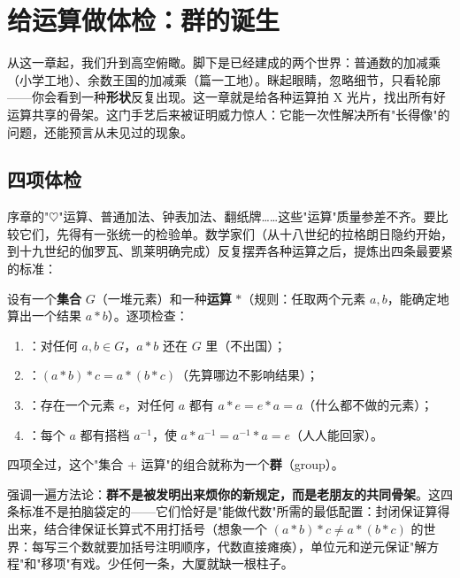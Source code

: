 \chapter{给运算做体检：群的诞生}

从这一章起，我们升到高空俯瞰。脚下是已经建成的两个世界：普通数的加减乘（小学工地）、余数王国的加减乘（篇一工地）。眯起眼睛，忽略细节，只看轮廓——你会看到一种\textbf{形状}反复出现。这一章就是给各种运算拍 X 光片，找出所有好运算共享的骨架。这门手艺后来被证明威力惊人：它能一次性解决所有"长得像"的问题，还能预言从未见过的现象。

\section{四项体检}

序章的"$\heartsuit$"运算、普通加法、钟表加法、翻纸牌……这些"运算"质量参差不齐。要比较它们，先得有一张统一的检验单。数学家们（从十八世纪的拉格朗日隐约开始，到十九世纪的伽罗瓦、凯莱明确完成）反复摆弄各种运算之后，提炼出四条最要紧的标准：

\begin{dingyi}
设有一个\textbf{集合} $G$（一堆元素）和一种\textbf{运算} $*$（规则：任取两个元素 $a, b$，能确定地算出一个结果 $a*b$）。逐项检查：
\begin{enumerate}
  \item {}：对任何 $a, b\in G$，$a*b$ 还在 $G$ 里（不出国）；
  \item {}：$(a*b)*c = a*(b*c)$（先算哪边不影响结果）；
  \item {}：存在一个元素 $e$，对任何 $a$ 都有 $a*e = e*a = a$（什么都不做的元素）；
  \item {}：每个 $a$ 都有搭档 $a^{-1}$，使 $a*a^{-1} = a^{-1}*a = e$（人人能回家）。
\end{enumerate}
四项全过，这个"集合 + 运算"的组合就称为一个\textbf{群}（group）。
\end{dingyi}

强调一遍方法论：\textbf{群不是被发明出来烦你的新规定，而是老朋友的共同骨架}。这四条标准不是拍脑袋定的——它们恰好是"能做代数"所需的最低配置：封闭保证算得出来，结合律保证长算式不用打括号（想象一个 $(a*b)*c \ne a*(b*c)$ 的世界：每写三个数就要加括号注明顺序，代数直接瘫痪），单位元和逆元保证"解方程"和"移项"有戏。少任何一条，大厦就缺一根柱子。

